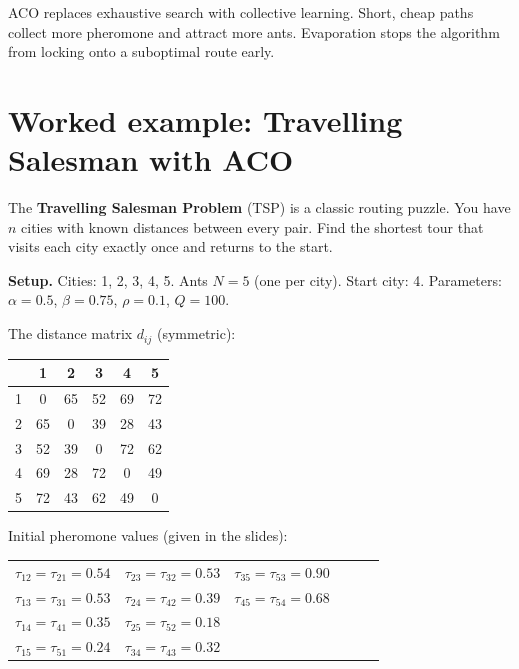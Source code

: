 \documentclass[a4paper,11pt]{article}
\newcommand{\vocab}[1]{\textbf{\color{navy}#1}}
\begin{document}
\begin{keytake}
ACO replaces exhaustive search with collective learning.
Short, cheap paths collect more pheromone and attract more ants.
Evaporation stops the algorithm from locking onto a suboptimal route early.
\end{keytake}

\section{Worked example: Travelling Salesman with ACO}

The \vocab{Travelling Salesman Problem} (TSP) is a classic routing puzzle.
You have $n$ cities with known distances between every pair.
Find the shortest tour that visits each city exactly once and returns to the start.

\noindent\textbf{Setup.}
Cities: 1, 2, 3, 4, 5.
Ants $N = 5$ (one per city).
Start city: 4.
Parameters: $\alpha = 0.5$, $\beta = 0.75$, $\rho = 0.1$, $Q = 100$.

\medskip
The distance matrix $d_{ij}$ (symmetric):

\begin{center}\small
\begin{tabular}{@{}c|ccccc@{}}
\toprule
      & 1  & 2  & 3  & 4  & 5  \\
\midrule
1     & 0  & 65 & 52 & 69 & 72 \\
2     & 65 & 0  & 39 & 28 & 43 \\
3     & 52 & 39 & 0  & 72 & 62 \\
4     & 69 & 28 & 72 & 0  & 49 \\
5     & 72 & 43 & 62 & 49 & 0  \\
\bottomrule
\end{tabular}
\end{center}

Initial pheromone values (given in the slides):

\begin{center}\small
\begin{tabular}{@{}llllll@{}}
\toprule
$\tau_{12}=\tau_{21}=0.54$ &
$\tau_{23}=\tau_{32}=0.53$ &
$\tau_{35}=\tau_{53}=0.90$ \\
$\tau_{13}=\tau_{31}=0.53$ &
$\tau_{24}=\tau_{42}=0.39$ &
$\tau_{45}=\tau_{54}=0.68$ \\
$\tau_{14}=\tau_{41}=0.35$ &
$\tau_{25}=\tau_{52}=0.18$ & \\
$\tau_{15}=\tau_{51}=0.24$ &
$\tau_{34}=\tau_{43}=0.32$ & \\
\bottomrule
\end{tabular}
\end{center}
\end{document}

